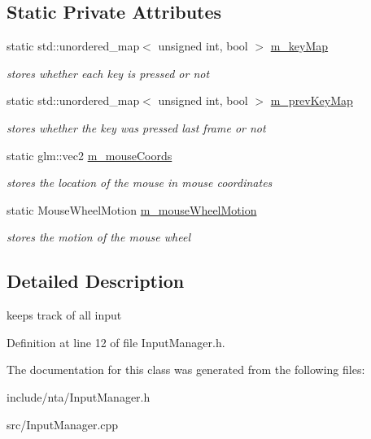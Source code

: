\subsection*{Static Private Attributes}
\begin{DoxyCompactItemize}
\item 
\mbox{\label{classnta_1_1InputManager_a00aa67b739a6762219dc97cc2e23c3f5}} 
static std\+::unordered\+\_\+map$<$ unsigned int, bool $>$ \hyperlink{classnta_1_1InputManager_a00aa67b739a6762219dc97cc2e23c3f5}{m\+\_\+key\+Map}
\begin{DoxyCompactList}\small\item\em stores whether each key is pressed or not \end{DoxyCompactList}\item 
\mbox{\label{classnta_1_1InputManager_a5fef83321ad801f59f5a4f3b2542db47}} 
static std\+::unordered\+\_\+map$<$ unsigned int, bool $>$ \hyperlink{classnta_1_1InputManager_a5fef83321ad801f59f5a4f3b2542db47}{m\+\_\+prev\+Key\+Map}
\begin{DoxyCompactList}\small\item\em stores whether the key was pressed last frame or not \end{DoxyCompactList}\item 
\mbox{\label{classnta_1_1InputManager_a9f0b4d6c78182a49313144c712cb460e}} 
static glm\+::vec2 \hyperlink{classnta_1_1InputManager_a9f0b4d6c78182a49313144c712cb460e}{m\+\_\+mouse\+Coords}
\begin{DoxyCompactList}\small\item\em stores the location of the mouse in mouse coordinates \end{DoxyCompactList}\item 
\mbox{\label{classnta_1_1InputManager_ae66e8c723d33a51ece6700e266191f01}} 
static Mouse\+Wheel\+Motion \hyperlink{classnta_1_1InputManager_ae66e8c723d33a51ece6700e266191f01}{m\+\_\+mouse\+Wheel\+Motion}
\begin{DoxyCompactList}\small\item\em stores the motion of the mouse wheel \end{DoxyCompactList}\end{DoxyCompactItemize}


\subsection{Detailed Description}
keeps track of all input 

Definition at line 12 of file Input\+Manager.\+h.



The documentation for this class was generated from the following files\+:\begin{DoxyCompactItemize}
\item 
include/nta/Input\+Manager.\+h\item 
src/Input\+Manager.\+cpp\end{DoxyCompactItemize}
